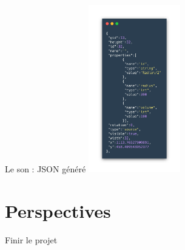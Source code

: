 \documentclass{beamer}
\begin{document}
\begin{frame}{Le son : JSON généré}
    \centering
    \includegraphics[width=4cm]{assets/jsonSource}
\end{frame}

\section{Perspectives}

\begin{frame}{Finir le projet}
  
\end{frame}
\end{document}
